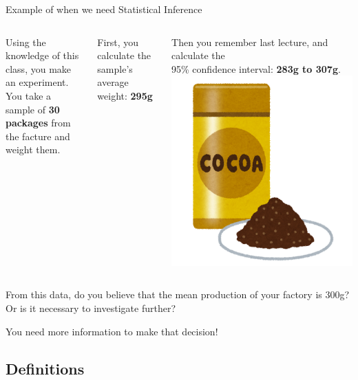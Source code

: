 \begin{frame}{Example of when we need Statistical Inference}
  \begin{columns}[T]
    Using the knowledge of this class, you make an experiment.\\
    You take a sample of {\bf 30 packages} from the facture and weight them.\bigskip

    First, you calculate the sample's average weight: {\bf 295g}\bigskip

    Then you remember last lecture, and calculate the\\
    95\% confidence interval: {\bf 283g to 307g}.\bigskip
    \hfill\includegraphics[width=1\textwidth]{../img/irasutoya_cocoa}
  \end{columns}\bigskip

  From this data, do you believe that the mean production of your factory is 300g? Or is it necessary to investigate further?\bigskip

  You need more information to make that decision!
\end{frame}

\subsection{Definitions}

